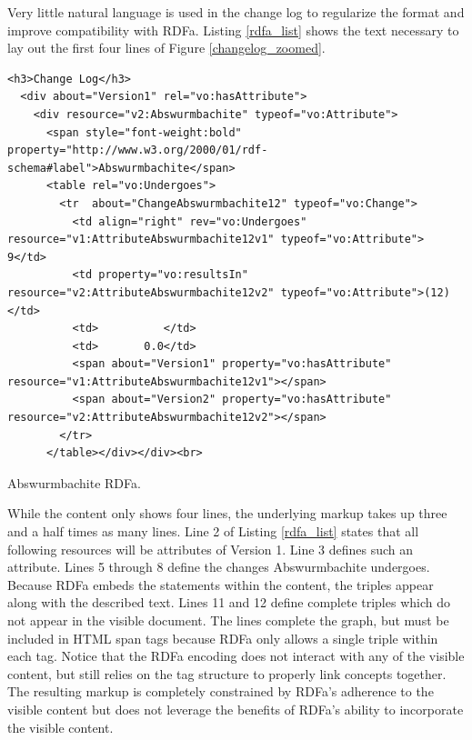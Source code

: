 Very little natural language is used in the change log to regularize the format and improve compatibility with RDFa.
Listing \ref{rdfa_list} shows the text necessary to lay out the first four lines of Figure \ref{changelog_zoomed}.
\begin{listing}
	\begin{verbatim}
<h3>Change Log</h3>
  <div about="Version1" rel="vo:hasAttribute">
    <div resource="v2:Abswurmbachite" typeof="vo:Attribute">
      <span style="font-weight:bold" property="http://www.w3.org/2000/01/rdf-schema#label">Abswurmbachite</span>
      <table rel="vo:Undergoes">
        <tr  about="ChangeAbswurmbachite12" typeof="vo:Change">
          <td align="right" rev="vo:Undergoes" resource="v1:AttributeAbswurmbachite12v1" typeof="vo:Attribute"> 9</td>
          <td property="vo:resultsIn" resource="v2:AttributeAbswurmbachite12v2" typeof="vo:Attribute">(12)</td>
          <td>          </td>
          <td>       0.0</td>
          <span about="Version1" property="vo:hasAttribute" resource="v1:AttributeAbswurmbachite12v1"></span>
          <span about="Version2" property="vo:hasAttribute" resource="v2:AttributeAbswurmbachite12v2"></span>
        </tr>
      </table></div></div><br>
	\end{verbatim}
	\caption{Abswurmbachite RDFa.\label{rdfa_list}}
\end{listing}
While the content only shows four lines, the underlying markup takes up three and a half times as many lines.
Line 2 of Listing \ref{rdfa_list} states that all following resources will be attributes of Version 1.
Line 3 defines such an attribute.
Lines 5 through 8 define the changes Abswurmbachite undergoes.
Because RDFa embeds the statements within the content, the triples appear along with the described text.
Lines 11 and 12 define complete triples which do not appear in the visible document.
The lines complete the graph, but must be included in HTML span tags because RDFa only allows a single triple within each tag.
Notice that the RDFa encoding does not interact with any of the visible content, but still relies on the tag structure to properly link concepts together.
The resulting markup is completely constrained by RDFa's adherence to the visible content but does not leverage the benefits of RDFa's ability to incorporate the visible content.

